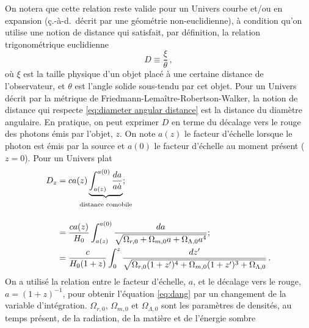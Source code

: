 On notera que cette relation reste valide pour un Univers courbe et/ou en expansion 
(ç.-à-d.\ décrit par une géométrie non-euclidienne), 
à condition qu'on utilise une notion de distance qui satisfait, par définition, la relation trigonométrique euclidienne
\begin{equation}\label{eq:diameter angular distance}
       D \equiv \frac{\xi}{\theta}\, ,
\end{equation} 
où $\xi$ est la taille physique d'un objet placé à une certaine distance de l'observateur, et $\theta$ est l'angle solide sous-tendu 
par cet objet. Pour un Univers décrit par la métrique de Friedmann-Lemaître-Robertson-Walker,
la notion de distance qui respecte \eqref{eq:diameter angular distance} est la distance du diamètre angulaire. 
En pratique, on peut exprimer $D$ en terme du décalage vers le rouge des photons émis par l'objet, $z$. 
On note $a(z)$ le facteur d'échelle lorsque le photon est émis par la source et $a(0)$ le facteur d'échelle au moment présent ($z=0$).
Pour un Univers plat \citep[voir les manuels de référence][]{Coles2002,Dodelson2003,Bartelmann2004}
\begin{align}
        D_z &= c a(z) \underbrace{\int_{a(z)}^{a(0)} \frac{da}{a \dot{a}}}_{\strut\mathclap{\text{distance comobile}}}; \\[2ex]
                \nonumber
              &= \frac{c a(z)}{H_0} \int_{a(z)}^{a(0)} \frac{da}{\sqrt{\Omega_{r,0} + \Omega_{m,0} a  + \Omega_{\Lambda,0}a^{4}}}; \\
              \label{eq:dang}
              &= \frac{c}{H_0(1 + z)} \int_{0}^{z} \frac{dz'}{\sqrt{\Omega_{r,0}(1 + z')^{4} + \Omega_{m,0} (1 + z')^{3} + \Omega_{\Lambda,0} }}\, .
\end{align}
On a utilisé la relation entre le facteur d'échelle, $a$, et le décalage vers le rouge, $a = (1 + z)^{-1}$, pour obtenir l'équation \eqref{eq:dang} 
par un changement de la variable d'intégration. 
$\Omega_{r,0}$, $\Omega_{m,0}$ et $\Omega_{\Lambda, 0}$ sont les paramètres de densités, au temps présent, de la radiation, de la matière et de l'énergie sombre 
